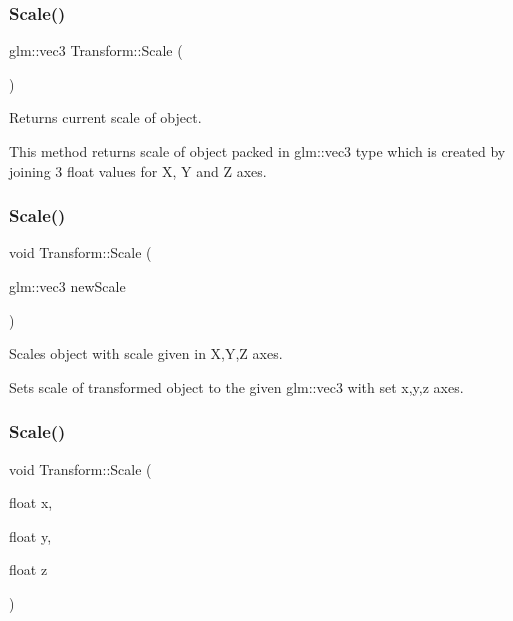 \subsubsection{\texorpdfstring{Scale()}{Scale()}\hspace{0.1cm}{\footnotesize\ttfamily [1/3]}}
{\footnotesize\ttfamily glm\+::vec3 Transform\+::\+Scale (\begin{DoxyParamCaption}{ }\end{DoxyParamCaption})\hspace{0.3cm}{\ttfamily [inline]}}



Returns current scale of object. 

This method returns scale of object packed in glm\+::vec3 type which is created by joining 3 float values for X, Y and Z axes. \mbox{\label{class_transform_ab4af0a98c37f0284074e30e3d6d2ca41}} 
\subsubsection{\texorpdfstring{Scale()}{Scale()}\hspace{0.1cm}{\footnotesize\ttfamily [2/3]}}
{\footnotesize\ttfamily void Transform\+::\+Scale (\begin{DoxyParamCaption}\item[{glm\+::vec3}]{new\+Scale }\end{DoxyParamCaption})\hspace{0.3cm}{\ttfamily [inline]}}



Scales object with scale given in X,Y,Z axes. 

Sets scale of transformed object to the given glm\+::vec3 with set x,y,z axes. \mbox{\label{class_transform_a0a30b57dd24261f559604ea64e69e0f9}} 
\subsubsection{\texorpdfstring{Scale()}{Scale()}\hspace{0.1cm}{\footnotesize\ttfamily [3/3]}}
{\footnotesize\ttfamily void Transform\+::\+Scale (\begin{DoxyParamCaption}\item[{float}]{x,  }\item[{float}]{y,  }\item[{float}]{z }\end{DoxyParamCaption})\hspace{0.3cm}{\ttfamily [inline]}}



